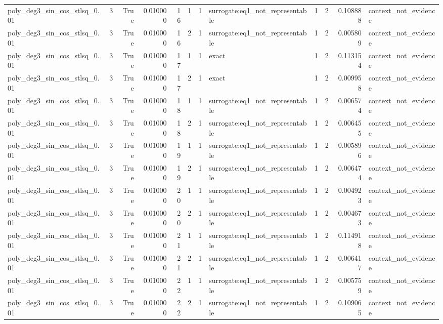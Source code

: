 \begin{tabular}{lrrrrrrlrrrl}
poly\_deg3\_sin\_cos\_stlsq\_0.01 & 3 & True & 0.010000 & 16 & 1 & 1 & surrogate:eq1\_not\_representable & 1 & 2 & 0.108888 & context\_not\_evidence \\
poly\_deg3\_sin\_cos\_stlsq\_0.01 & 3 & True & 0.010000 & 16 & 2 & 1 & surrogate:eq1\_not\_representable & 1 & 2 & 0.005809 & context\_not\_evidence \\
poly\_deg3\_sin\_cos\_stlsq\_0.01 & 3 & True & 0.010000 & 17 & 1 & 1 & exact & 1 & 2 & 0.113154 & context\_not\_evidence \\
poly\_deg3\_sin\_cos\_stlsq\_0.01 & 3 & True & 0.010000 & 17 & 2 & 1 & exact & 1 & 2 & 0.009958 & context\_not\_evidence \\
poly\_deg3\_sin\_cos\_stlsq\_0.01 & 3 & True & 0.010000 & 18 & 1 & 1 & surrogate:eq1\_not\_representable & 1 & 2 & 0.006574 & context\_not\_evidence \\
poly\_deg3\_sin\_cos\_stlsq\_0.01 & 3 & True & 0.010000 & 18 & 2 & 1 & surrogate:eq1\_not\_representable & 1 & 2 & 0.006455 & context\_not\_evidence \\
poly\_deg3\_sin\_cos\_stlsq\_0.01 & 3 & True & 0.010000 & 19 & 1 & 1 & surrogate:eq1\_not\_representable & 1 & 2 & 0.005896 & context\_not\_evidence \\
poly\_deg3\_sin\_cos\_stlsq\_0.01 & 3 & True & 0.010000 & 19 & 2 & 1 & surrogate:eq1\_not\_representable & 1 & 2 & 0.006474 & context\_not\_evidence \\
poly\_deg3\_sin\_cos\_stlsq\_0.01 & 3 & True & 0.010000 & 20 & 1 & 1 & surrogate:eq1\_not\_representable & 1 & 2 & 0.004923 & context\_not\_evidence \\
poly\_deg3\_sin\_cos\_stlsq\_0.01 & 3 & True & 0.010000 & 20 & 2 & 1 & surrogate:eq1\_not\_representable & 1 & 2 & 0.004673 & context\_not\_evidence \\
poly\_deg3\_sin\_cos\_stlsq\_0.01 & 3 & True & 0.010000 & 21 & 1 & 1 & surrogate:eq1\_not\_representable & 1 & 2 & 0.114918 & context\_not\_evidence \\
poly\_deg3\_sin\_cos\_stlsq\_0.01 & 3 & True & 0.010000 & 21 & 2 & 1 & surrogate:eq1\_not\_representable & 1 & 2 & 0.006417 & context\_not\_evidence \\
poly\_deg3\_sin\_cos\_stlsq\_0.01 & 3 & True & 0.010000 & 22 & 1 & 1 & surrogate:eq1\_not\_representable & 1 & 2 & 0.005759 & context\_not\_evidence \\
poly\_deg3\_sin\_cos\_stlsq\_0.01 & 3 & True & 0.010000 & 22 & 2 & 1 & surrogate:eq1\_not\_representable & 1 & 2 & 0.109065 & context\_not\_evidence \\

\end{tabular}
